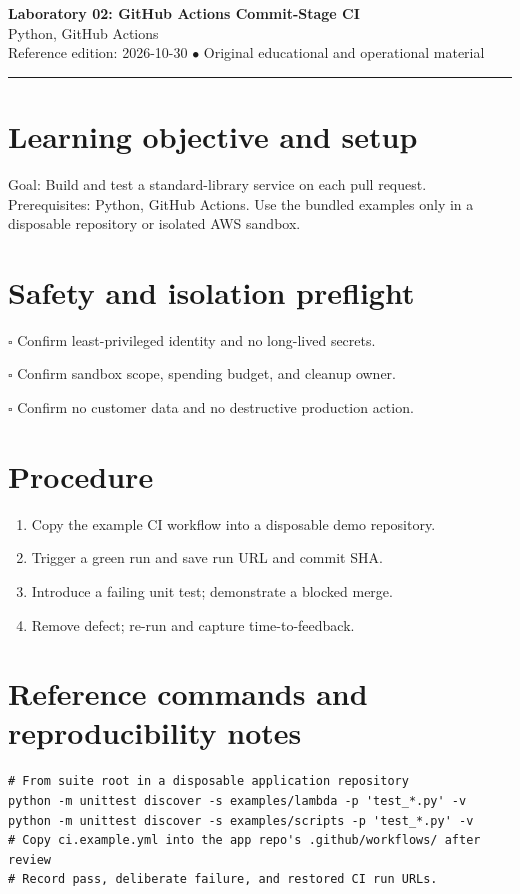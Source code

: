 \documentclass[10pt,letterpaper]{article}
\begin{document}
\begin{center}
{\LARGE\bfseries\color{cdblue}Laboratory 02: GitHub Actions Commit-Stage CI}\\[7pt]
{\large Python, GitHub Actions}\\[6pt]
{\small Reference edition: 2026-10-30 $\bullet$ Original educational and operational material}
\end{center}
\noindent\color{cdblue}\rule{\linewidth}{1.2pt}\color{black}
\vspace{0.4em}
\section{Learning objective and setup}
Goal: Build and test a standard-library service on each pull request. Prerequisites: Python, GitHub Actions. Use the bundled examples only in a disposable repository or isolated AWS sandbox.


\section{Safety and isolation preflight}
\noindent $\square$ Confirm least-privileged identity and no long-lived secrets.\par\vspace{0.35em}
\noindent $\square$ Confirm sandbox scope, spending budget, and cleanup owner.\par\vspace{0.35em}
\noindent $\square$ Confirm no customer data and no destructive production action.\par\vspace{0.35em}

\section{Procedure}
\begin{enumerate}
\item Copy the example CI workflow into a disposable demo repository.
\item Trigger a green run and save run URL and commit SHA.
\item Introduce a failing unit test; demonstrate a blocked merge.
\item Remove defect; re-run and capture time-to-feedback.
\end{enumerate}

\section{Reference commands and reproducibility notes}
\begin{verbatim}
# From suite root in a disposable application repository
python -m unittest discover -s examples/lambda -p 'test_*.py' -v
python -m unittest discover -s examples/scripts -p 'test_*.py' -v
# Copy ci.example.yml into the app repo's .github/workflows/ after review
# Record pass, deliberate failure, and restored CI run URLs.
\end{verbatim}
\end{document}
